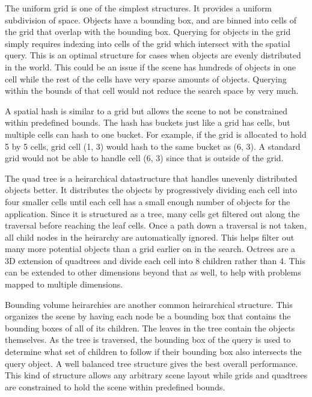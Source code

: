 \documentclass[12pt]{ucthesis}
\begin{document}
The uniform grid is one of the simplest structures.
It provides a uniform subdivision of space.
Objects have a bounding box, and are binned into cells of the grid that overlap with the bounding box.\cite{culling-bf, applications-spatial, chess}
Querying for objects in the grid simply requires indexing into cells of the grid which intersect with the spatial query.
This is an optimal structure for cases when objects are evenly distributed in the world.
This could be an issue if the scene has hundreds of objects in one cell while the rest of the cells have very sparse amounts of objects.
Querying within the bounds of that cell would not reduce the search space by very much.

A spatial hash is similar to a grid but allows the scene to not be constrained within predefined bounds.
The hash has buckets just like a grid has cells, but multiple cells can hash to one bucket.
For example, if the grid is allocated to hold 5 by 5 cells, grid cell (1, 3) would hash to the same bucket as (6, 3).
A standard grid would not be able to handle cell (6, 3) since that is outside of the grid.

The quad tree is a heirarchical datastructure that handles unevenly distributed objects better.\cite{applications-spatial}
It distributes the objects by progressively dividing each cell into four smaller cells until each cell has a small enough number of objects for the application.
Since it is structured as a tree, many cells get filtered out along the traversal before reaching the leaf cells.
Once a path down a traversal is not taken, all child nodes in the heirarchy are automatically ignored.
This helps filter out many more potential objects than a grid earlier on in the search.
Octrees are a 3D extension of quadtrees and divide each cell into 8 children rather than 4.
This can be extended to other dimensions beyond that as well, to help with problems mapped to multiple dimensions.\cite{applications-spatial}

Bounding volume heirarchies are another common heirarchical structure.\cite{BVH}
This organizes the scene by having each node be a bounding box that contains the bounding boxes of all of its children.
The leaves in the tree contain the objects themselves.
As the tree is traversed, the bounding box of the query is used to determine what set of children to follow if their bounding box also intersects the query object.
A well balanced tree structure gives the best overall performance.
This kind of structure allows any arbitrary scene layout while grids and quadtrees are constrained to hold the scene within predefined bounds.
\end{document}
